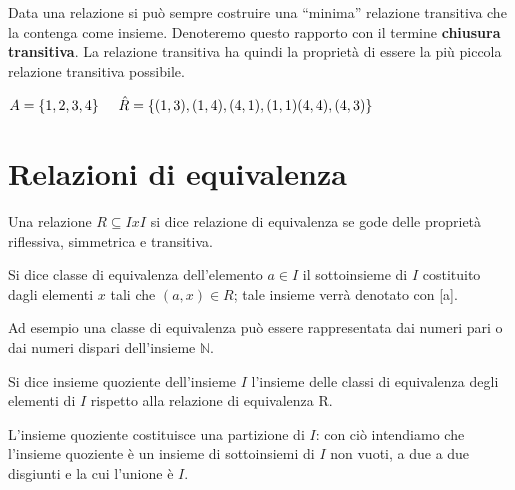 Data una relazione si può sempre costruire una “minima” relazione transitiva che la contenga come insieme. Denoteremo questo rapporto con il termine \textbf{chiusura transitiva}. La relazione transitiva ha quindi la proprietà di essere la più piccola relazione transitiva possibile.
\begin{example}
    $A=\{1,2,3,4\}\hspace{0,5cm}\hat{R}=\{(1,3),(1,4),(4,1),(1,1)(4,4),(4,3)\}$
\end{example}

\section{Relazioni di equivalenza}
\begin{definition}
    Una relazione $R\subseteq IxI$ si dice relazione di equivalenza se gode delle proprietà riflessiva, simmetrica e transitiva.
\end{definition}
\begin{definition}
    Si dice classe di equivalenza dell’elemento $a\in I$ il sottoinsieme di $I$ costituito dagli elementi $x$ tali che $(a, x)\in R$; tale insieme verrà denotato con [a].
\end{definition}
Ad esempio una classe di equivalenza può essere rappresentata dai numeri pari o dai numeri dispari dell'insieme $\mathbb{N}$.
\begin{definition}
    Si dice insieme quoziente dell’insieme $I$ l’insieme delle classi di equivalenza degli elementi di $I$ rispetto alla relazione di equivalenza R.
\end{definition}
L’insieme quoziente costituisce una partizione di $I$: con ciò intendiamo che l’insieme quoziente è un insieme di sottoinsiemi di $I$ non vuoti, a due a due disgiunti e la cui l’unione è $I$.

